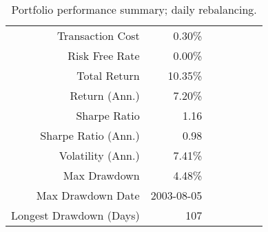 \begin{table}[p]
\centering
\caption{Portfolio performance summary; daily rebalancing.}
\begin{tabular}{rrrrrrr}
\toprule
\midrule
Transaction Cost & 0.30\% \\
Risk Free Rate & 0.00\% \\
\hline
Total Return & 10.35\% \\
Return (Ann.) & 7.20\% \\
Sharpe Ratio & 1.16 \\
Sharpe Ratio (Ann.) & 0.98 \\
Volatility (Ann.) & 7.41\% \\
Max Drawdown & 4.48\% \\
Max Drawdown Date & 2003-08-05 \\
Longest Drawdown (Days) & 107 \\
\bottomrule
\end{tabular}
\end{table}
